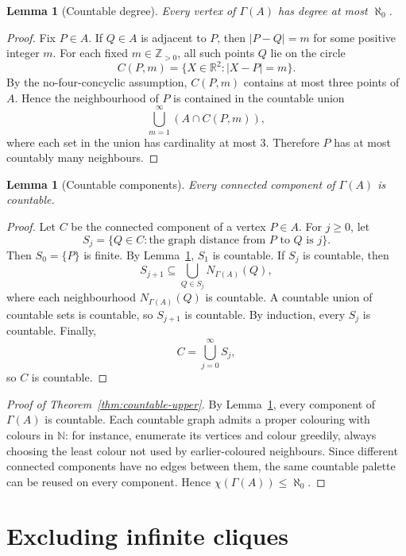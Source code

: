 \documentclass[11pt,a4paper]{amsart}
\newtheorem{lemma}[theorem]{Lemma}
\theoremstyle{definition}
\newcommand{\R}{\mathbb{R}}
\newcommand{\N}{\mathbb{N}}
\newcommand{\Z}{\mathbb{Z}}
\begin{document}
\begin{lemma}[Countable degree]\label{lem:countable-degree}
Every vertex of $\Gamma(A)$ has degree at most $\aleph_0$.
\end{lemma}

\begin{proof}
Fix $P\in A$.  If $Q\in A$ is adjacent to $P$, then $|P-Q|=m$ for some positive integer $m$.  For each fixed $m\in\Z_{>0}$, all such points $Q$ lie on the circle
\[
        C(P,m)=\{X\in\R^2: |X-P|=m\}.
\]
By the no-four-concyclic assumption, $C(P,m)$ contains at most three points of $A$.  Hence the neighbourhood of $P$ is contained in the countable union
\[
        \bigcup_{m=1}^{\infty} (A\cap C(P,m)),
\]
where each set in the union has cardinality at most $3$.  Therefore $P$ has at most countably many neighbours.
\end{proof}

\begin{lemma}[Countable components]\label{lem:countable-components}
Every connected component of $\Gamma(A)$ is countable.
\end{lemma}

\begin{proof}
Let $C$ be the connected component of a vertex $P\in A$.  For $j\geq 0$, let
\[
        S_j=\{Q\in C: \text{the graph distance from }P\text{ to }Q\text{ is }j\}.
\]
Then $S_0=\{P\}$ is finite.  By Lemma~\ref{lem:countable-degree}, $S_1$ is countable.  If $S_j$ is countable, then
\[
        S_{j+1}\subseteq \bigcup_{Q\in S_j} N_{\Gamma(A)}(Q),
\]
where each neighbourhood $N_{\Gamma(A)}(Q)$ is countable.  A countable union of countable sets is countable, so $S_{j+1}$ is countable.  By induction, every $S_j$ is countable.  Finally,
\[
        C=\bigcup_{j=0}^{\infty} S_j,
\]
so $C$ is countable.
\end{proof}

\begin{proof}[Proof of Theorem~\ref{thm:countable-upper}]
By Lemma~\ref{lem:countable-components}, every component of $\Gamma(A)$ is countable.  Each countable graph admits a proper colouring with colours in $\N$: for instance, enumerate its vertices and colour greedily, always choosing the least colour not used by earlier-coloured neighbours.  Since different connected components have no edges between them, the same countable palette can be reused on every component.  Hence $\chi(\Gamma(A))\leq \aleph_0$.
\end{proof}

\section{Excluding infinite cliques}
\end{document}
